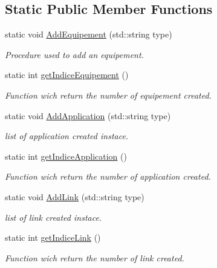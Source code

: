\subsection*{Static Public Member Functions}
\begin{CompactItemize}
\item 
static void \hyperlink{class_generator_a8745946602d6e64e5b131d682737e77}{AddEquipement} (std::string type)
\begin{CompactList}\small\item\em Procedure used to add an equipement. \item\end{CompactList}\item 
static int \hyperlink{class_generator_714d17823705b75edfbb9bbe37d35c7a}{getIndiceEquipement} ()
\begin{CompactList}\small\item\em Function wich return the number of equipement created. \item\end{CompactList}\item 
static void \hyperlink{class_generator_bd0054d3e88aaeda093ac882861d6410}{AddApplication} (std::string type)
\begin{CompactList}\small\item\em list of application created instace. \item\end{CompactList}\item 
static int \hyperlink{class_generator_32a1fcc314ade484d84669ac7e510e68}{getIndiceApplication} ()
\begin{CompactList}\small\item\em Function wich return the number of application created. \item\end{CompactList}\item 
static void \hyperlink{class_generator_3fe9d83270bd9d22b9307d3b0a26ea39}{AddLink} (std::string type)
\begin{CompactList}\small\item\em list of link created instace. \item\end{CompactList}\item 
static int \hyperlink{class_generator_05e1b6e209fb7730960de318fccaa86a}{getIndiceLink} ()
\begin{CompactList}\small\item\em Function wich return the number of link created. \item\end{CompactList}\end{CompactItemize}
